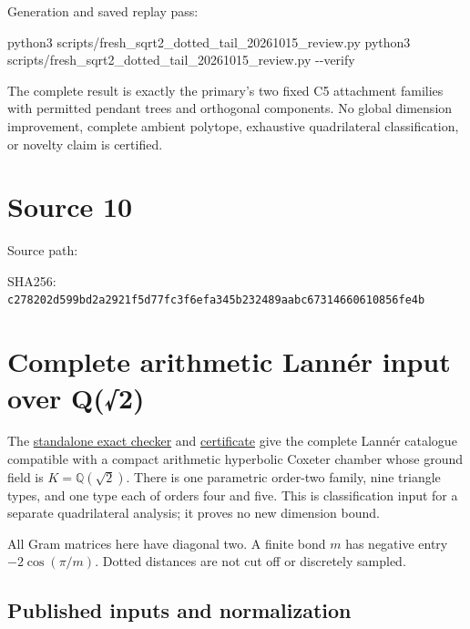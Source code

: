 \documentclass[
  10pt,
]{report}
\newenvironment{Shaded}{}{}
\newcommand{\AttributeTok}[1]{\textcolor[rgb]{0.49,0.56,0.16}{#1}}
\newcommand{\ExtensionTok}[1]{#1}
\newcommand{\NormalTok}[1]{#1}
\begin{document}
Generation and saved replay pass:

\begin{Shaded}
\begin{Highlighting}[]
\ExtensionTok{python3}\NormalTok{ scripts/fresh\_sqrt2\_dotted\_tail\_20261015\_review.py}
\ExtensionTok{python3}\NormalTok{ scripts/fresh\_sqrt2\_dotted\_tail\_20261015\_review.py }\AttributeTok{{-}{-}verify}
\end{Highlighting}
\end{Shaded}

The complete result is exactly the primary's two fixed C5 attachment
families with permitted pendant trees and orthogonal components. No
global dimension improvement, complete ambient polytope, exhaustive
quadrilateral classification, or novelty claim is certified.

\clearpage

\chapter{Source 10}\label{source-10}

Source path: 

SHA256:
\nolinkurl{c278202d599bd2a2921f5d77fc3f6efa345b232489aabc67314660610856fe4b}

\chapter{Complete arithmetic Lannér input over
Q(√2)}\label{complete-arithmetic-lannuxe9r-input-over-q2}

The
\href{../scripts/fresh_sqrt2_lanner_catalogue_20261015.py}{standalone
exact checker} and
\href{fresh_sqrt2_lanner_catalogue_20261015.json}{certificate} give the
complete Lannér catalogue compatible with a compact arithmetic
hyperbolic Coxeter chamber whose ground field is
\(K=\mathbb Q(\sqrt2)\). There is one parametric order-two family, nine
triangle types, and one type each of orders four and five. This is
classification input for a separate quadrilateral analysis; it proves no
new dimension bound.

All Gram matrices here have diagonal two. A finite bond \(m\) has
negative entry \(-2\cos(\pi/m)\). Dotted distances are not cut off or
discretely sampled.

\section{Published inputs and
normalization}\label{published-inputs-and-normalization}
\end{document}
